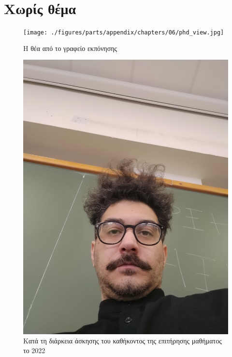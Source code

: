 \section{Χωρίς θέμα}
\begin{figure}[H]\centering
  \texttt{[image: ./figures/parts/appendix/chapters/06/phd\_view.jpg]}
  \caption{\small Η θέα από το γραφείο εκπόνησης}
\end{figure}
\begin{figure}[H]\centering
  \includegraphics[scale=0.15]{./figures/parts/appendix/chapters/06/epitirisi.jpg}
  \caption{\small Κατά τη διάρκεια άσκησης του καθήκοντος της επιτήρησης
           μαθήματος το 2022}
\end{figure}
